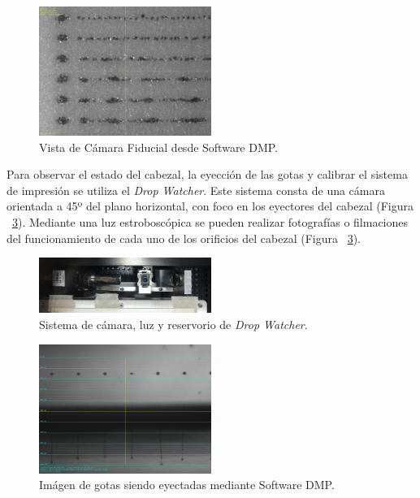 \begin{figure}[H]
  \centering
    \includegraphics[width=0.5\textwidth]{Figuras/Figura_Vista_Camara_Fiducial}
  \caption{Vista de Cámara Fiducial desde Software DMP.}
  \label{fig:Figura_Vista_Camara_Fiducial}
\end{figure}

Para observar el estado del cabezal, la eyección de las gotas y calibrar el sistema de impresión se utiliza el \textit{Drop Watcher}. Este sistema consta de una cámara orientada a 45º del plano horizontal, con foco en los eyectores del cabezal (Figura ~\ref{fig:Figura_Drop_Watcher}). Mediante una luz estroboscópica se pueden realizar fotografías o filmaciones del funcionamiento de cada uno de los orificios del cabezal (Figura ~\ref{fig:Figura_Drop_Watcher}).

\begin{figure}[H]
  \centering
    \includegraphics[width=0.5\textwidth]{Figuras/Figura_Camara_Drop_Watcher}
  \caption{Sistema de cámara, luz y reservorio de \textit{Drop Watcher}.}
  \label{fig:Figura_Camara_Drop_Watcher}
\end{figure}

\begin{figure}[H]
  \centering
    \includegraphics[width=0.5\textwidth]{Figuras/Figura_Drop_Watcher}
  \caption{Imágen de gotas siendo eyectadas mediante Software DMP.}
  \label{fig:Figura_Drop_Watcher}
\end{figure}

